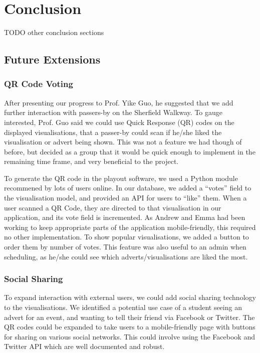 \documentclass[a4paper, titlepage]{article}
\begin{document}
\newpage
\section{Conclusion}
TODO other conclusion sections

\subsection{Future Extensions}

\subsubsection{QR Code Voting}
After presenting our progress to Prof. Yike Guo, he suggested that we add further interaction with 
passers-by on the Sherfield Walkway. To gauge interested, Prof. Guo said we could use Quick Response 
(QR) codes on the displayed visualisations, that a passer-by could scan if he/she liked the 
visualisation or advert being shown. This was not a feature we had though of before, but decided as a 
group that it would be quick enough to implement in the remaining time frame, and very beneficial to
the project. 

To generate the QR code in the playout software, we used a Python module recommened by lots of users 
online. In our database, we added a ``votes'' field to the visualisation model, and provided an API
for users to ``like'' them. When a user scanned a QR Code, they are directed to that visualisation in 
our application, and its vote field is incremented. As Andrew and Emma had been working to keep 
appropriate parts of the application mobile-friendly, this required no other implementation. To show 
popular visualisations, we added a button to order them by number of votes. This feature was also 
useful to an admin when scheduling, as he/she could see which adverts/visualisations are liked the 
most. 


\subsubsection{Social Sharing}
To expand interaction with external users, we could add social sharing technology to the 
visualisations. We identified a potential use case of a student seeing an advert for an event, and 
wanting to tell their friend via Facebook or Twitter. The QR codes could be expanded to take users to
a mobile-friendly page with buttons for sharing on various social networks. This could involve using 
the Facebook and Twitter API which are well documented and robust. 
\end{document}
